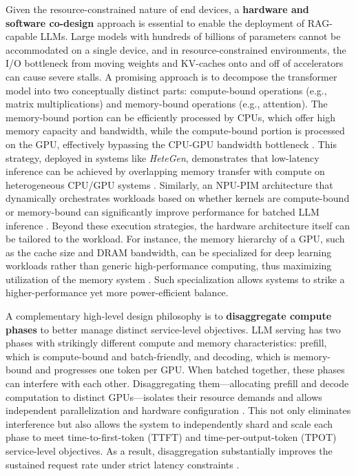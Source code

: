 \documentclass[11pt]{article}
\begin{document}
Given the resource-constrained nature of end devices, a \textbf{hardware and software co-design} approach is essential to enable the deployment of RAG-capable LLMs. Large models with hundreds of billions of parameters cannot be accommodated on a single device, and in resource-constrained environments, the I/O bottleneck from moving weights and KV-caches onto and off of accelerators can cause severe stalls. A promising approach is to decompose the transformer model into two conceptually distinct parts: compute-bound operations (e.g., matrix multiplications) and memory-bound operations (e.g., attention). The memory-bound portion can be efficiently processed by CPUs, which offer high memory capacity and bandwidth, while the compute-bound portion is processed on the GPU, effectively bypassing the CPU-GPU bandwidth bottleneck \cite{ref313,ref314,ref315}. This strategy, deployed in systems like \emph{HeteGen}, demonstrates that low-latency inference can be achieved by overlapping memory transfer with compute on heterogeneous CPU/GPU systems \cite{ref314}. Similarly, an NPU-PIM architecture that dynamically orchestrates workloads based on whether kernels are compute-bound or memory-bound can significantly improve performance for batched LLM inference \cite{ref315}. Beyond these execution strategies, the hardware architecture itself can be tailored to the workload. For instance, the memory hierarchy of a GPU, such as the cache size and DRAM bandwidth, can be specialized for deep learning workloads rather than generic high-performance computing, thus maximizing utilization of the memory system \cite{ref316}. Such specialization allows systems to strike a higher-performance yet more power-efficient balance.

A complementary high-level design philosophy is to \textbf{disaggregate compute phases} to better manage distinct service-level objectives. LLM serving has two phases with strikingly different compute and memory characteristics: prefill, which is compute-bound and batch-friendly, and decoding, which is memory-bound and progresses one token per GPU. When batched together, these phases can interfere with each other. Disaggregating them---allocating prefill and decode computation to distinct GPUs---isolates their resource demands and allows independent parallelization and hardware configuration \cite{ref317}. This not only eliminates interference but also allows the system to independently shard and scale each phase to meet time-to-first-token (TTFT) and time-per-output-token (TPOT) service-level objectives. As a result, disaggregation substantially improves the sustained request rate under strict latency constraints \cite{ref317}.
\end{document}
